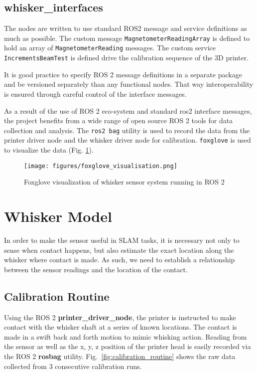 \documentclass[runningheads]{llncs}
\begin{document}
\subsection{whisker\_interfaces}

The nodes are written to use standard ROS2 message and service definitions as much as possible. The custom message \verb|MagnetometerReadingArray| is defined to hold an array of \verb|MagnetometerReading| messages. The custom service \verb|IncrementsBeamTest| is defined drive the calibration sequence of the 3D printer.

It is good practice to specify ROS 2 message definitions in a separate package and be versioned separately than any functional nodes. That way interoperability is ensured through careful control of the interface messages.

As a result of the use of ROS 2 eco-system and standard ros2 interface messages, the project benefits from a wide range of open source ROS 2 tools for data collection and analysis. The \verb|ros2 bag| utility is used to record the data from the printer driver node and the whisker driver node for calibration. \verb|foxglove| is used to visualize the data (Fig. \ref{fig:foxglove}).

\begin{figure}[H]
    \centering
    \texttt{[image: figures/foxglove\_visualisation.png]}
    \caption{Foxglove visualization of whisker sensor system running in ROS 2}
    \label{fig:foxglove}
\end{figure}

\section{Whisker Model}

In order to make the sensor useful in SLAM tasks, it is necessary not  only to sense when contact happens, but also estimate the exact location along the whisker where contact is made. As such, we need to establish a relationship between the sensor readings and the location of the contact.

\subsection{Calibration Routine}

Using the ROS 2 \textbf{printer\_driver\_node}, the printer is instructed to make contact with the whisker shaft at a series of known locations. The contact is made in a swift back and forth motion to mimic whisking action. Reading from the sensor as well as the x, y, z position of the printer head is easily recorded via the ROS 2 \textbf{rosbag} utility. Fig.~\ref{fig:calibration_routine} shows the raw data collected from 3 consecutive calibration runs.
\end{document}
